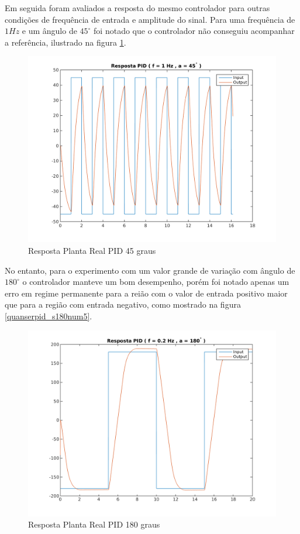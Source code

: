 \documentclass[a4paper,11pt]{article}
\begin{document}
Em seguida foram avaliados a resposta do mesmo controlador para outras condições de frequência de entrada e amplitude do sinal. Para uma frequência de $1Hz$ e um ângulo de $45^\circ$ foi notado que o controlador não conseguiu acompanhar a referência, ilustrado na figura \ref{fig:quanserpid_s45num1}.

\begin{figure}[H]
    \centering
    \includegraphics[width=0.8\linewidth]{tex/img/quanserpid_s45num1.png}
    \caption{Resposta Planta Real PID 45 graus}
    \label{fig:quanserpid_s45num1}
\end{figure}

No entanto, para o experimento com um valor grande de variação com ângulo de $180^\circ$ o controlador manteve um bom desempenho, porém foi notado apenas um erro em regime permanente para a reião com o valor de entrada positivo maior que para a região com entrada negativo, como mostrado na figura \ref{quanserpid_s180num5}.

\begin{figure}[H]
    \centering
    \includegraphics[width=0.8\linewidth]{tex/img/quanserpid_s180num5.png}
    \caption{Resposta Planta Real PID 180 graus}
    \label{fig:quanserpid_s180num5}
\end{figure}
\end{document}
